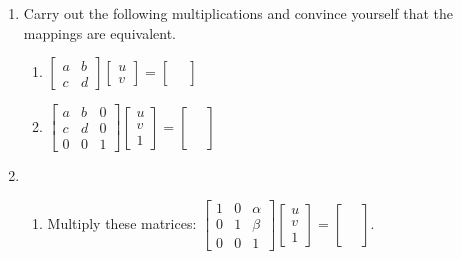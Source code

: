 \documentclass[../gatm.tex]{subfiles}
\begin{document}
\begin{enumerate}
\setcounter{enumi}{\value{mp_problem_i}}
\item Carry out the following multiplications and convince yourself that the mappings are equivalent.\begin{multicols}{2}
\begin{enumerate}
\item $\left[\begin{array}{cc}a & b \\ c & d\end{array}\right]\left[\begin{array}{c} u \\ v \end{array}\right]=\left[\begin{array}{c} \phantom{u} \\ \phantom{v} \end{array}\right]$
\item $\left[\begin{array}{ccc}a & b & 0 \\ c & d & 0 \\ 0 & 0 & 1 \end{array}\right]\left[\begin{array}{c}u \\ v \\ 1 \end{array}\right] = \left[\begin{array}{c}\phantom{u} \\ \phantom{v} \\ \phantom{1} \end{array}\right]$
\end{enumerate}
\end{multicols}
\item \begin{enumerate}
\item Multiply these matrices: $\left[\begin{array}{ccc} 1 & 0 & \alpha \\ 0 & 1 & \beta \\ 0 & 0 & 1 \end{array}\right]\left[\begin{array}{c}u \\ v \\ 1 \end{array}\right]=\left[\begin{array}{c}\phantom{u} \\ \phantom{v} \\ \phantom{1}\end{array}\right].$

\end{enumerate}
\end{enumerate}
\end{document}

